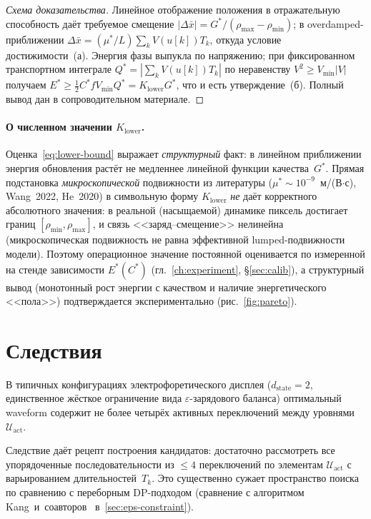 \begin{proof}[Схема доказательства]
Линейное отображение положения в отражательную способность даёт требуемое
смещение $|\Delta\bar x|=G^{*}/(\rho_{\max}-\rho_{\min})$; в overdamped-приближении
$\Delta\bar x=(\mu^{*}/L)\sum_k V(u[k])T_k$, откуда условие достижимости~(а).
Энергия фазы выпукла по напряжению; при фиксированном транспортном интеграле
$Q^{*}=|\sum_k V(u[k])T_k|$ по неравенству $V^2\ge V_{\min}|V|$ получаем
$E^{*}\ge\tfrac12 C^{*}f V_{\min}Q^{*}=K_{\mathrm{lower}}G^{*}$, что и есть утверждение~(б).
Полный вывод дан в сопроводительном материале.\qedhere
\end{proof}


\paragraph{О численном значении $K_{\mathrm{lower}}$.} Оценка~\eqref{eq:lower-bound}
выражает \emph{структурный} факт: в линейном приближении энергия обновления
растёт не медленнее линейной функции качества~$G^*$. Прямая подстановка
\emph{микроскопической} подвижности из литературы
($\mu^* \sim 10^{-9}$~м/(В$\cdot$с), Wang~2022, He~2020) в символьную форму
$K_{\mathrm{lower}}$ \emph{не} даёт корректного абсолютного значения: в
реальной (насыщаемой) динамике пиксель достигает границ
$[\rho_{\min}, \rho_{\max}]$, и связь <<заряд--смещение>>
нелинейна (микроскопическая подвижность не равна эффективной
lumped-подвижности модели). Поэтому операционное значение постоянной
оценивается по измеренной на стенде зависимости $E^{*}(C^{*})$
(гл.~\ref{ch:experiment}, \S\ref{sec:calib}), а структурный вывод (монотонный
рост энергии с качеством и наличие энергетического <<пола>>)
подтверждается экспериментально (рис.~\ref{fig:pareto}).


\section{Следствия}\label{sec:corollaries}

\begin{corollary}
\label{cor:search-space}
В типичных конфигурациях электрофоретического дисплея
($d_{\mathrm{state}} = 2$, единственное жёсткое ограничение вида
$\varepsilon$-зарядового баланса) оптимальный waveform содержит не более
четырёх активных переключений между уровнями~$\mathcal{U}_{\mathrm{act}}$.
\end{corollary}

Следствие даёт рецепт построения кандидатов: достаточно
рассмотреть все упорядоченные последовательности из $\le 4$ переключений по
элементам $\mathcal{U}_{\mathrm{act}}$ с варьированием длительностей~$T_k$.
Это существенно сужает пространство поиска по сравнению с переборным
DP-подходом (сравнение с алгоритмом
Kang~и~соавторов~\cite{kang2025_dp_waveform} в~\ref{sec:eps-constraint}).

